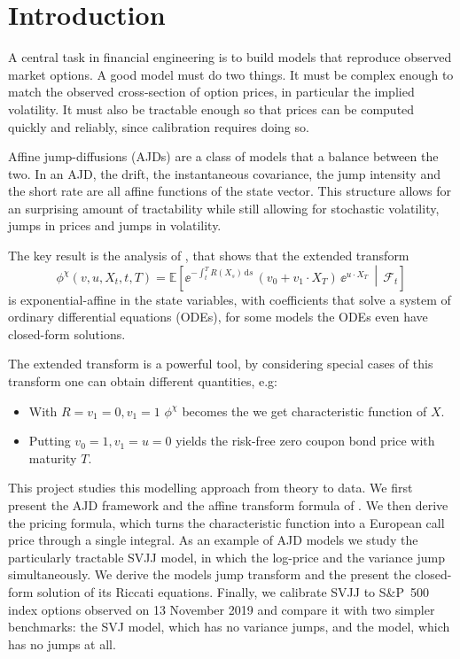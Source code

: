 \chapter{Introduction}
\label{ch:intro}
A central task in financial engineering is to build models that reproduce observed market
options. A good model must do two things. It must be complex enough to match the observed
cross-section of option prices, in particular the implied volatility. It must also be tractable
enough so that prices can be computed quickly and reliably, since calibration requires doing so.

Affine jump-diffusions (AJDs) are a class of models that a balance between the two.
In an AJD, the drift, the instantaneous covariance, the jump intensity and the short rate are all
affine functions of the state vector. This structure allows for an surprising amount of tractability
while still allowing for stochastic volatility, jumps in prices and jumps in volatility.

The key result is the analysis of \parencite{Duffie2000}, that shows that the extended transform
\begin{equation}
  \phi^{\chi}(v,u,X_t,t,T)
  = \mathbb{E}\!\left[ \ee^{-\int_t^T R(X_s)\,\mathrm{d}s}\,(v_0+v_1\cdot X_T)\,\ee^{u\cdot X_T} \,\middle|\, \mathcal{F}_t \right]
  \label{eq:extended-transform}
\end{equation}
is exponential-affine in the state variables, with coefficients that solve a system of ordinary
differential equations (ODEs), for some models the ODEs even have closed-form solutions.

The extended transform is a powerful tool, by considering special cases of this transform one can
obtain different quantities, e.g:
\begin{itemize}
  \item With $R = v_1 = 0, v_1 = 1$ $\phi^{\chi}$ becomes the we get characteristic function of $X$.
  \item Putting $v_0 = 1, v_1 = u =0$ yields the risk-free zero coupon bond price with maturity $T$.
\end{itemize}

This project studies this modelling approach from theory to data. We first present the AJD framework
and the affine transform formula of \parencite{Duffie2000}. We then derive the \parencite{Lewis2001}
pricing formula, which turns the characteristic function into a European call price through a single
integral. As an example of AJD models we study the particularly tractable SVJJ model, in which the
log-price and the variance jump simultaneously. We derive the models jump transform and the
present the closed-form solution of its Riccati equations. Finally, we calibrate SVJJ to S\&P~500
index options observed on 13 November 2019 and compare it with two simpler benchmarks: the SVJ
model, which has no variance jumps, and the \parencite{Heston1993} model, which has no jumps at
all.

